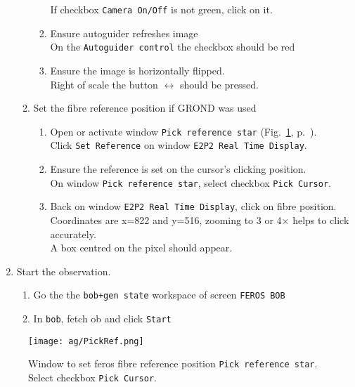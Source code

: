 \documentclass[11pt,fleqn]{book}
\def\figref#1{Fig.~\ref{fig:#1}, p.~\pageref{fig:#1}}
\begin{document}
\begin{enumerate}
\begin{enumerate}
\begin{enumerate}
            If checkbox \texttt{Camera On/Off} is not green, click on it.
      \item Ensure autoguider refreshes image\\
            On the \texttt{Autoguider control} the checkbox  should be red
      \item Ensure the image is horizontally flipped.\\
            Right of scale the button $\leftrightarrow$ should be pressed.
    \end{enumerate}
    \item Set the fibre reference position if GROND was used
    \begin{enumerate}
      \item Open or activate window \texttt{Pick reference star} (\figref{pickref}).\\
            Click \texttt{Set Reference} on window  \texttt{E2P2 Real Time Display}.
      \item Ensure the reference is set on the cursor's clicking position.\\
            On window \texttt{Pick reference star}, select checkbox \texttt{Pick Cursor}.
      \item Back on window \texttt{E2P2 Real Time Display}, click on fibre position.\\
            Coordinates are x=822 and y=516, zooming to 3 or 4$\times$ helps to click accurately.\\
            A box centred on the pixel should appear.
    \end{enumerate}
  \end{enumerate}
  \item Start the observation.
  \begin{enumerate}
    \item Go the the \texttt{bob+gen state} workspace of screen \texttt{FEROS BOB}
    \item In \texttt{bob}, fetch \gls{ob} and click \texttt{Start}
  \end{enumerate}
\end{enumerate}

\begin{figure}[!ht]
\centering
\texttt{[image: ag/PickRef.png]}
\caption[Window to set FEROS fibre reference position]{Window to set \gls{feros} fibre reference position \texttt{Pick reference star}. Select checkbox \texttt{Pick Cursor}.}
\label{fig:pickref}
\end{figure}
\end{document}
